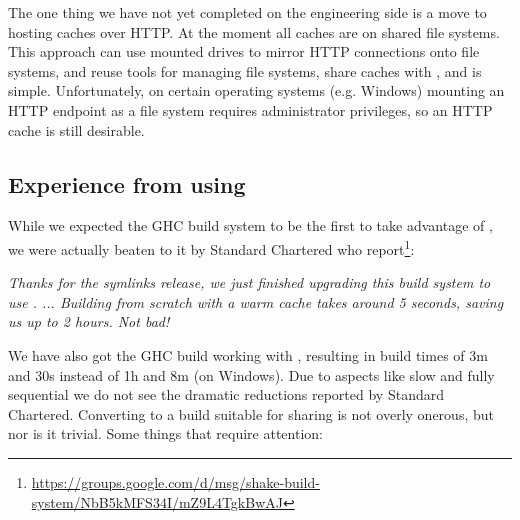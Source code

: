 The one thing we have not yet completed on the engineering side is a move to
hosting caches over HTTP. At the moment all caches are on shared file systems.
This approach can use mounted drives to mirror HTTP connections onto file
systems, and reuse tools for managing file systems, share caches with
, and is simple. Unfortunately, on certain operating systems (e.g.
Windows) mounting an HTTP endpoint as a file system requires administrator
privileges, so an HTTP cache is still desirable.

\subsection{Experience from using \Cloud \Shake}\label{sec-using-cloud-shake}

While we expected the GHC build system to be the first to take advantage of
\Cloud \Shake, we were actually beaten to it by Standard Chartered who
report\footnote{\url{https://groups.google.com/d/msg/shake-build-system/NbB5kMFS34I/mZ9L4TgkBwAJ}}:

\vspace{1mm}
\begin{center}
\parbox{0.8 \textwidth}{\emph{Thanks for the symlinks release, we just finished upgrading this build
system to use \cmd{-}. ... Building from scratch with a warm cache
takes around 5 seconds, saving us up to 2 hours. Not bad!}}
\end{center}
\vspace{1mm}

We have also got the GHC build working with \Cloud \Shake, resulting in build
times of 3m and 30s instead of 1h and 8m (on Windows). Due to aspects like slow
and fully sequential  we do not see the dramatic reductions
reported by Standard Chartered. Converting to a build suitable for sharing is
not overly onerous, but nor is it trivial. Some things that require attention:

